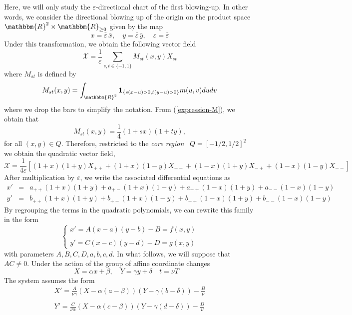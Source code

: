 \documentclass[11pt,psamsfonts]{article}
\newcommand{\tmem}[1]{{\em #1\/}}
\newcommand{\tmmathbf}[1]{\ensuremath{\boldsymbol{#1}}}
\theoremstyle{definition}
\theoremstyle{remark}
\newcommand{\cR}{\ensuremath{\mathbbm{R}}}
\newcommand{\eps}{\varepsilon }
\begin{document}
Here, we will only study the $\eps$-directional chart of the first blowing-up. In other words, we consider the directional blowing up of the origin on the product space $\cR^2 \times \cR_{\ge 0}$ given by the map
$$
x = \bar{\eps}\, \bar x,\quad y = \bar{\eps}\, \bar y,\quad \eps = \bar{\eps}
$$ 
Under this transformation, we obtain the following vector field 
\[ \mathcal{X} = \frac{1}{\varepsilon} \sum_{s, t \in \{ - 1, 1 \}} M_{s t}
   (x, y) X_{s t} \]
where $M_{s t}$ is defined by
\[ M_{s t} (x, y) = \int_{\cR^2} \tmmathbf{1}_{\{ s (x - u) > 0, t (y -
   u) > 0 \}} m (u, v) d u d v \]
where we drop the bars to simplify the notation. From (\ref{expression-M}), we obtain that
$$
  M_{s t} (x, y) = \frac{1}{4} (1 + s x) (1 + t y), 
 $$
for all $(x,y)\in Q$. Therefore, restricted to the {\tmem{core region}} \ $Q = [- 1/2, 1/2]^2$ we obtain
the quadratic vector field,
{\small
\[ {\mathcal{X} = \frac{1}{4 \varepsilon} [(1 + x) (1 + y) X_{+ +} + (1
   + x) (1 - y) X_{+ -} + (1 - x) (1 + y) X_{- +} + (1 - x) (1 - y) X_{- -}]}
\]
}
After multiplication by $\eps$, we write the associated differential equations as 
\begin{eqnarray*}
  x' & = & a_{+ +} (1 + x) (1 + y) + a_{+ -} (1 + x) (1 - y) + a_{- +} (1 - x)
  (1 + y) + a_{- -} (1 - x) (1 - y)\\
  y' & = & b_{+ +} (1 + x) (1 + y) + b_{+ -} (1 + x) (1 - y) + b_{- +} (1 - x)
  (1 + y) + b_{- -} (1 - x) (1 - y)
\end{eqnarray*}
By regrouping the terms in the quadratic polynomials, we can rewrite this family in the form
\begin{equation}
  \left\{ \begin{array}{l}
    x' = A (x - a) (y - b) - B = f (x, y)\\
    \\
    y' = C (x - c) (y - d) - D = g (x, y)
  \end{array} \right. \label{sistema}
\end{equation}
with parameters $A, B, C, D, a, b, c, d$. In what follows, we will suppose
that $A C \neq 0$. Under the action of the group of affine coordinate changes
\[ X = \alpha x + \beta, \quad Y = \gamma y + \delta \quad t = \nu T \quad \]
The system assumes the form
\[ \begin{array}{l}
     X' = \frac{A}{\nu \gamma} (X - \alpha (a - \beta)) (Y - \gamma (b -
     \delta)) - \frac{B}{\nu}\\
     \\
     Y' = \frac{C}{\nu \alpha} (X - \alpha (c - \beta)) (Y - \gamma (d -
     \delta)) - \frac{D}{\nu}
   \end{array} \]
\end{document}
